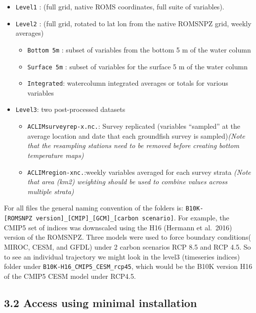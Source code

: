 \documentclass[
]{article}
\providecommand{\tightlist}{%
  \setlength{\itemsep}{0pt}\setlength{\parskip}{0pt}}
\begin{document}
\begin{itemize}
\tightlist
\item
  \texttt{Level1} : (full grid, native ROMS coordinates, full suite of
  variables).
\item
  \texttt{Level2} : (full grid, rotated to lat lon from the native
  ROMSNPZ grid, weekly averages)

  \begin{itemize}
  \tightlist
  \item
    \texttt{Bottom\ 5m} : subset of variables from the bottom 5 m of the
    water column
  \item
    \texttt{Surface\ 5m} : subset of variables for the surface 5 m of
    the water column
  \item
    \texttt{Integrated}: watercolumn integrated averages or totals for
    various variables
  \end{itemize}
\item
  \texttt{Level3}: two post-processed datasets

  \begin{itemize}
  \tightlist
  \item
    \texttt{ACLIMsurveyrep-x.nc.}: Survey replicated (variables
    ``sampled'' at the average location and date that each groundfish
    survey is sampled)\emph{(Note that the resampling stations need to
    be removed before creating bottom temperature maps)}\\
  \item
    \texttt{ACLIMregion-xnc.}:weekly variables averaged for each survey
    strata \emph{(Note that area (km2) weighting should be used to
    combine values across multiple strata)}
  \end{itemize}
\end{itemize}

For all files the general naming convention of the folders is:
\texttt{B10K-{[}ROMSNPZ\ version{]}\_{[}CMIP{]}\_{[}GCM{]}\_{[}carbon\ scenario{]}}.
For example, the CMIP5 set of indices was downscaled using the H16
(Hermann et al.~2016) version of the ROMSNPZ. Three models were used to
force boundary conditions( MIROC, CESM, and GFDL) under 2 carbon
scenarios RCP 8.5 and RCP 4.5. So to see an individual trajectory we
might look in the level3 (timeseries indices) folder under
\texttt{B10K-H16\_CMIP5\_CESM\_rcp45}, which would be the B10K version
H16 of the CMIP5 CESM model under RCP4.5.

\hypertarget{access-using-minimal-installation}{%
\subsection{3.2 Access using minimal
installation}\label{access-using-minimal-installation}}
\end{document}
